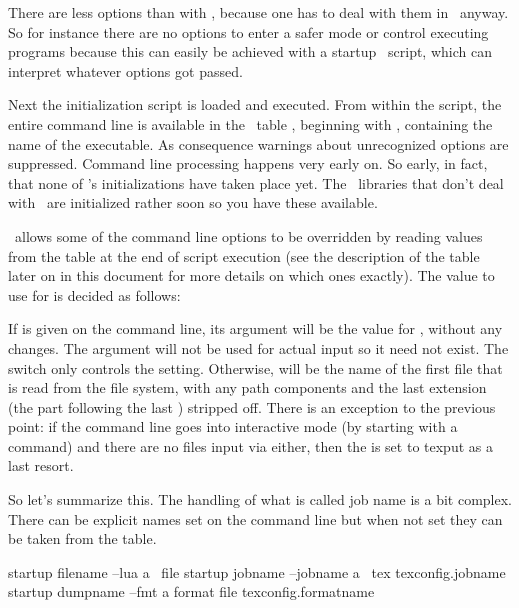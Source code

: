 There are less options than with \LUATEX, because one has to deal with them in
\LUA\ anyway. So for instance there are no options to enter a safer mode or
control executing programs because this can easily be achieved with a startup
\LUA\ script, which can interpret whatever options got passed.

Next the initialization script is loaded and executed. From within the script,
the entire command line is available in the \LUA\ table , beginning
with , containing the name of the executable. As consequence
warnings about unrecognized options are suppressed. Command line processing
happens very early on. So early, in fact, that none of \TEX's initializations
have taken place yet. The \LUA\ libraries that don't deal with \TEX\ are
initialized rather soon so you have these available.

\LUAMETATEX\ allows some of the command line options to be overridden by reading
values from the  table at the end of script execution (see the
description of the  table later on in this document for more
details on which ones exactly). The value to use for \type {\jobname} is decided
as follows:

\startitemize
\startitem
    If  is given on the command line, its argument will be the
    value for \type {\jobname}, without any changes. The argument will not be
    used for actual input so it need not exist. The  switch only
    controls the \type {\jobname} setting.
\stopitem
\startitem
    Otherwise, \type {\jobname} will be the name of the first file that is read
    from the file system, with any path components and the last extension (the
    part following the last ) stripped off.
\stopitem
\startitem
    There is an exception to the previous point: if the command line goes into
    interactive mode (by starting with a command) and there are no files input
    via \type {\everyjob} either, then the \type {\jobname} is set to \type
    {texput} as a last resort.
\stopitem
\stopitemize

So let's summarize this. The handling of what is called job name is a bit complex.
There can be explicit names set on the command line but when not set they can be
taken from the  table.

\starttabulate[|l|T|T|T|]
\NC startup filename \NC --lua     \NC a \LUA\ file  \NC                      \NC \NR
\NC startup jobname  \NC --jobname \NC a \TEX\ tex   \NC texconfig.jobname    \NC \NR
\NC startup dumpname \NC --fmt     \NC a format file \NC texconfig.formatname \NC \NR
\stoptabulate

